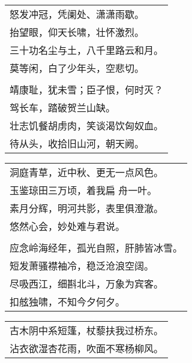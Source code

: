\nopagebreak%
\nopagebreak%
\noindent\begin{minipage}{\linewidth}
  \vskip-3pt\begin{table}[H]
    \centering
    \begin{tabular}{@{}l@{}}
怒发冲冠，凭阑处、潇潇雨歇。\\
抬望眼，仰天长啸，壮怀激烈。\\
三十功名尘与土，八千里路云和月。\\
莫等闲，白了少年头，空悲切。\\
\\
靖康耻，犹未雪；臣子恨，何时灭？\\
驾长车，踏破贺兰山缺。\\
壮志饥餐胡虏肉，笑谈渴饮匈奴血。\\
待从头，收拾旧山河，朝天阙。
    \end{tabular}
  \end{table}
\end{minipage}
\vspace{1cm}


\nopagebreak%
\nopagebreak%
\noindent\begin{minipage}{\linewidth}
  \vskip-3pt\begin{table}[H]
    \centering
    \begin{tabular}{@{}l@{}}
洞庭青草，近中秋、更无一点风色。\\
玉鉴琼田三万顷，着我扁 舟一叶。\\
素月分辉，明河共影，表里俱澄澈。\\
悠然心会，妙处难与君说。\\
\\
应念岭海经年，孤光自照，肝肺皆冰雪。\\
短发萧骚襟袖冷，稳泛沧浪空阔。\\
尽吸西江，细斟北斗，万象为宾客。\\
扣舷独啸，不知今夕何夕。
    \end{tabular}
  \end{table}
\end{minipage}
\vspace{1cm}


\nopagebreak%
\nopagebreak%
\noindent\begin{minipage}{\linewidth}
  \vskip-3pt\begin{table}[H]
    \centering
    \begin{tabular}{@{}l@{}}
古木阴中系短篷，杖藜扶我过桥东。\\
沾衣欲湿杏花雨，吹面不寒杨柳风。
    \end{tabular}
  \end{table}
\end{minipage}
\vspace{1cm}


